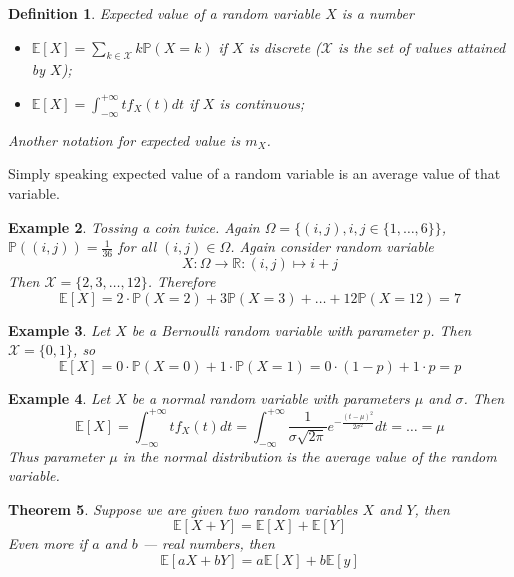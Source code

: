 \documentclass[12pt]{article}
\newtheorem{theorem}{Theorem}[subsection]
\newtheorem{definition}[theorem]{Definition}
\newtheorem{example}[theorem]{Example}
\begin{document}
\begin{definition} Expected value of a random variable $X$ is a number
    \begin{itemize}
        \item $\mathbb{E}[X]=\sum_{k\in \mathcal{X}} k \mathbb{P}(X=k)$ if $X$
              is discrete ($\mathcal{X}$ is the set of values attained by $X$);
        \item $\mathbb{E}[X]=\int_{-\infty}^{+\infty}t f_X(t)dt$ if $X$ is
              continuous;
    \end{itemize}
    Another notation for expected value is $m_X$.
\end{definition}

Simply speaking expected value of a random variable is an average value of that
variable.

\begin{example} Tossing a coin twice. Again $\Omega=\{(i,j),
        i,j\in \{1,\ldots,6\} \}$, $\mathbb{P}((i,j))=\frac{1}{36}$ for all
    $(i,j)\in \Omega$. Again consider random variable
    $$
        X:\Omega\to\mathbb{R}:(i,j)\mapsto i+j
    $$
    Then $\mathcal{X}=\{2,3,\ldots,12\}$. Therefore
    $$
        \mathbb{E}[X]
        =2\cdot \mathbb{P}(X=2)+3\mathbb{P}(X=3)+
        \ldots+12\mathbb{P}(X=12)
        =7
    $$
\end{example}

\begin{example} Let $X$ be a Bernoulli random variable with parameter $p$. Then
    $\mathcal{X}=\{0,1\}$, so
    $$
        \mathbb{E}[X]
        =0\cdot \mathbb{P}(X=0) + 1\cdot \mathbb{P}(X=1)
        =0 \cdot (1-p) + 1 \cdot p = p
    $$
\end{example}

\begin{example} Let $X$ be a normal random variable with parameters $\mu$ and
    $\sigma$. Then
    $$
        \mathbb{E}[X]
        =\int_{-\infty}^{+\infty}t f_X(t)dt
        =\int_{-\infty}^{+\infty}
        \frac{1}{\sigma\sqrt{2\pi }}
        e^{-\frac{{(t-\mu)}^2}{2\sigma^2}} dt
        =\ldots
        =\mu
    $$
    Thus parameter $\mu$ in the normal distribution is the average value of the
    random variable.
\end{example}

\begin{theorem} Suppose we are given two random variables $X$ and $Y$, then
    $$
        \mathbb{E}[X+Y]=\mathbb{E}[X]+\mathbb{E}[Y]
    $$
    Even more if $a$ and $b$ --- real numbers, then
    $$
        \mathbb{E}[aX+bY]=a\mathbb{E}[X]+b\mathbb{E}[y]
    $$
\end{theorem}
\end{document}
